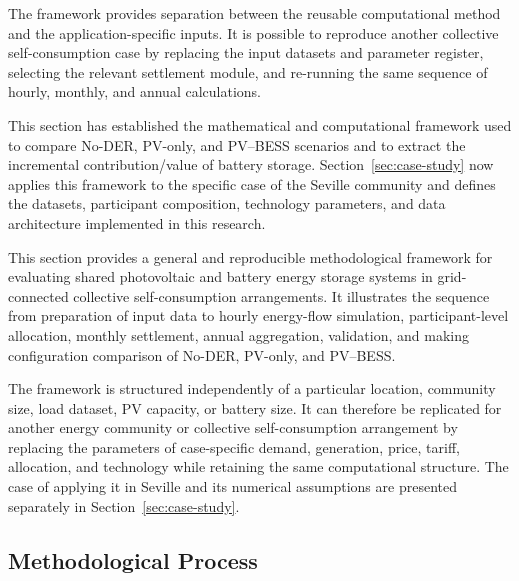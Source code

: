 The framework provides separation between the reusable computational method and the application-specific inputs. It is possible to reproduce another collective self-consumption case by replacing the input datasets and parameter register, selecting the relevant settlement module, and re-running the same sequence of hourly, monthly, and annual calculations.

This section has established the mathematical and computational framework used to compare No-DER, PV-only, and PV--BESS scenarios and to extract the incremental contribution/value of battery storage. Section~\ref{sec:case-study} now applies this framework to the specific case of the Seville community and defines the datasets, participant composition, technology parameters, and data architecture implemented in this research.



This section provides a general and reproducible methodological framework for evaluating shared photovoltaic and battery energy storage systems in grid-connected collective self-consumption arrangements. It illustrates the sequence from preparation of input data to hourly energy-flow simulation, participant-level allocation, monthly settlement, annual aggregation, validation, and making configuration comparison of No-DER, PV-only, and PV--BESS.

The framework is structured independently of a particular location, community size, load dataset, PV capacity, or battery size. It can therefore be replicated for another energy community or collective self-consumption arrangement by replacing the parameters of case-specific demand, generation, price, tariff, allocation, and technology while retaining the same computational structure. The case of applying it in Seville and its numerical assumptions are presented separately in Section~\ref{sec:case-study}.

\subsection{Methodological Process}
\label{sec:overall_methodological_process}

